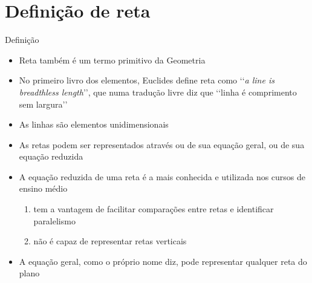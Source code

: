 \section{Definição de reta}

\begin{frame}[fragile]{Definição}

    \begin{itemize}
        \item Reta também é um termo primitivo da Geometria
        \pause

        \item No primeiro livro dos elementos, Euclides define reta como 
            \lq\lq \textit{a line is breadthless length}\rq\rq, que numa tradução livre 
            diz que \lq\lq linha é comprimento sem largura\rq\rq
        \pause

        \item As linhas são elementos unidimensionais
        \pause

        \item As retas podem ser representados através ou de sua equação geral, ou de
            sua equação reduzida
        \pause

        \item  A equação reduzida de uma reta é a mais conhecida e utilizada nos cursos de ensino médio
        \pause
        \begin{enumerate}
            \item tem a vantagem de facilitar comparações entre retas e identificar paralelismo
            \pause 
            \item não é capaz de representar retas verticais
        \end{enumerate}
        \pause

        \item A equação geral, como o próprio nome diz, pode representar qualquer reta do plano
   \end{itemize}

\end{frame}

